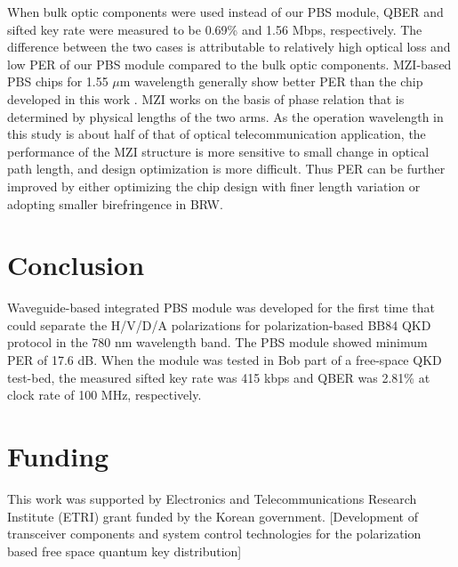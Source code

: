 \documentclass[letterpaper, 10pt]{article}
\begin{document}
When bulk optic components were used instead of our PBS module, QBER and sifted key rate were measured to be 0.69\% and 1.56 Mbps, respectively.
The difference between the two cases is attributable to relatively high optical loss and low PER of our PBS module compared to the bulk optic components.
MZI-based PBS chips for 1.55 $\mu$m wavelength generally show better PER than the chip developed in this work \cite{Hashizume:2015ta}.
MZI works on the basis of phase relation that is determined by physical lengths of the two arms.
As the operation wavelength in this study is about half of that of optical telecommunication application, the performance of the MZI structure is more sensitive to small change in optical path length, and design optimization is more difficult.
Thus PER can be further improved by either optimizing the chip design with finer length variation or adopting smaller birefringence in BRW.


\section{Conclusion}
Waveguide-based integrated PBS module was developed for the first time that could separate the H/V/D/A polarizations for polarization-based BB84 QKD protocol in the 780 nm wavelength band.
The PBS module showed minimum PER of 17.6 dB.
When the module was tested in Bob part of a free-space QKD test-bed, the measured sifted key rate was 415 kbps and QBER was 2.81\% at clock rate of 100 MHz, respectively.


\section*{Funding}
This work was supported by Electronics and Telecommunications Research Institute (ETRI) grant funded by the Korean government. [Development of transceiver components and system control technologies for the polarization based free space quantum key distribution]
\end{document}
